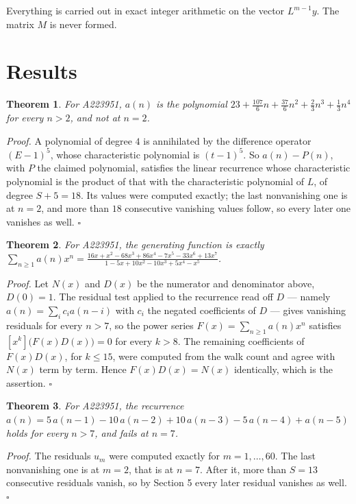 \documentclass[11pt]{article}
\newtheorem{theorem}{Theorem}
\theoremstyle{definition}
\begin{document}
Everything is carried out in exact integer arithmetic on the vector $L^{m-1}y$. The matrix $M$ is never formed.

\section{Results}

\begin{theorem} For A223951, $a(n)$ is the polynomial $23 + \frac{107}{6}n + \frac{37}{6}n^{2} + \frac{2}{3}n^{3} + \frac{1}{3}n^{4}$ for every $n > 2$, and not at $n = 2$.\end{theorem}

{\itshape Proof.} A polynomial of degree $4$ is annihilated by the difference operator $(E-1)^{5}$, whose characteristic polynomial is $(t-1)^{5}$. So $a(n) - P(n)$, with $P$ the claimed polynomial, satisfies the linear recurrence whose characteristic polynomial is the product of that with the characteristic polynomial of $L$, of degree $S + 5 = 18$. Its values were computed exactly; the last nonvanishing one is at $n = 2$, and more than $18$ consecutive vanishing values follow, so every later one vanishes as well. $\square$

\begin{theorem} For A223951, the generating function is exactly $\sum_{n\ge 1} a(n)x^n = \frac{16x + x^{2} - 68x^{3} + 86x^{4} - 7x^{5} - 33x^{6} + 13x^{7}}{1 - 5x + 10x^{2} - 10x^{3} + 5x^{4} - x^{5}}$.\end{theorem}

{\itshape Proof.} Let $N(x)$ and $D(x)$ be the numerator and denominator above, $D(0)=1$. The residual test applied to the recurrence read off $D$ --- namely $a(n) = \sum_i c_i a(n-i)$ with $c_i$ the negated coefficients of $D$ --- gives vanishing residuals for every $n > 7$, so the power series $F(x)=\sum_{n\ge 1}a(n)x^n$ satisfies $[x^k]\bigl(F(x)D(x)\bigr) = 0$ for every $k > 8$. The remaining coefficients of $F(x)D(x)$, for $k \le 15$, were computed from the walk count and agree with $N(x)$ term by term. Hence $F(x)D(x) = N(x)$ identically, which is the assertion. $\square$

\begin{theorem} For A223951, the recurrence $a(n) = 5\,a(n-1) - 10\,a(n-2) + 10\,a(n-3) - 5\,a(n-4) + a(n-5)$ holds for every $n > 7$, and fails at $n = 7$.\end{theorem}

{\itshape Proof.} The residuals $u_m$ were computed exactly for $m = 1,\dots,60$. The last nonvanishing one is at $m = 2$, that is at $n = 7$. After it, more than $S = 13$ consecutive residuals vanish, so by Section 5 every later residual vanishes as well. $\square$
\end{document}

